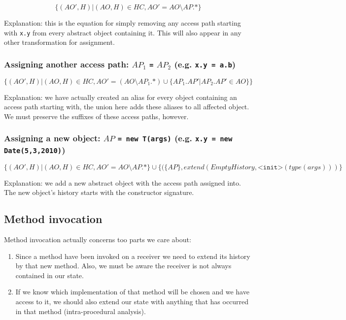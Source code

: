 \documentclass{article}
\begin{document}
$$
	\{(AO', H) | (AO, H) \in HC, AO' = AO \setminus AP \texttt{.*}\}
$$

Explanation: this is the equation for simply removing any access path starting with \texttt{x.y} from every abstract object containing it. This will also appear in any other transformation for assignment.

\subsubsection{Assigning another access path: $AP_1$ \texttt{=} $AP_2$ (e.g. \texttt{x.y = a.b})}

$$
\{(AO', H) | (AO, H) \in HC, AO' = (AO \setminus AP_1 \texttt{.*}) \cup \{AP_1 \texttt{.} AP' | AP_2\texttt{.}AP' \in AO\}\}
$$

Explanation: we have actually created an alias for every object containing an access path starting with, the union here adds these aliases to all affected object. We must preserve the suffixes of these access paths, however.

\subsubsection{Assigning a new object: $AP$ \texttt{= new T(args)} (e.g. \texttt{x.y = new Date(5,3,2010)})}

$$
	\{(AO', H) | (AO, H) \in HC, AO' = AO \setminus AP \texttt{.*}\} \cup \{(\{AP\}, extend(EmptyHistory, \texttt{<init>}(type(args)) )\}
$$

Explanation: we add a new abstract object with the access path assigned into. The new object's history starts with the constructor signature.

\subsection{Method invocation}

Method invocation actually concerns too parts we care about:

\begin{enumerate}
	\item Since a method have been invoked on a receiver we need to extend its history by that new method. Also, we must be aware the receiver is not always contained in our state.
	\item If we know which implementation of that method will be chosen and we have access to it, we should also extend our state with anything that has occurred in that method (intra-procedural analysis).
\end{enumerate}
\end{document}
